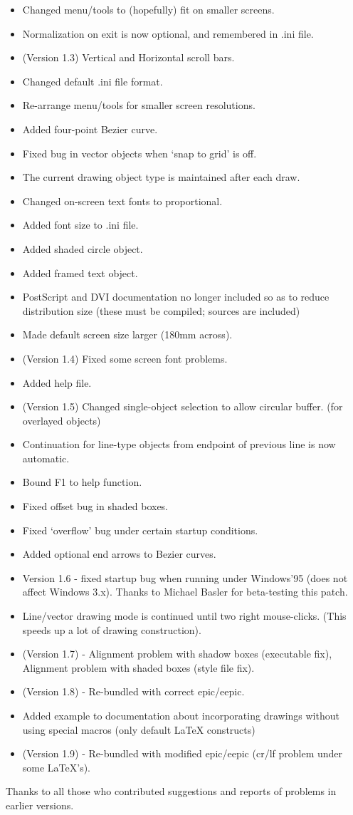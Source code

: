 \documentclass[a4paper]{article}
\begin{document}
\begin{itemize}
	\item Changed menu/tools to (hopefully) fit on smaller screens.
	\item Normalization on exit is now optional, and remembered in .ini file.
	\item (Version 1.3) Vertical and Horizontal scroll bars.
	\item Changed default .ini file format.
	\item Re-arrange menu/tools for smaller screen resolutions.
	\item Added four-point Bezier curve.
	\item Fixed bug in vector objects when `snap to grid' is off.
	\item The current drawing object type is maintained after each draw.
	\item Changed on-screen text fonts to proportional.
	\item Added font size to .ini file.
	\item Added shaded circle object.
	\item Added framed text object.
	\item PostScript and DVI documentation no longer included so as to reduce
		distribution size (these must be compiled; sources are included)
	\item Made default screen size larger (180mm across).
	\item (Version 1.4) Fixed some screen font problems.
	\item Added help file.
	\item (Version 1.5) Changed single-object selection to allow circular buffer.
		(for overlayed objects)
	\item Continuation for line-type objects from endpoint of previous line is now automatic.
	\item Bound F1 to help function.
	\item Fixed offset bug in shaded boxes.
	\item Fixed `overflow' bug under certain startup conditions.
	\item Added optional end arrows to Bezier curves.
	\item Version 1.6 - fixed startup bug when running under
		Windows'95 (does not affect Windows 3.x). Thanks to
		Michael Basler for beta-testing this patch.
	\item Line/vector drawing mode is continued until two right mouse-clicks.
		(This speeds up a lot of drawing construction).
	\item (Version 1.7) - Alignment problem with shadow boxes (executable fix),
		Alignment problem with shaded boxes (style file fix).
	\item (Version 1.8) - Re-bundled with correct epic/eepic.
	\item Added example to documentation about incorporating drawings
			without using special macros (only default \LaTeX\/ constructs)
	\item (Version 1.9) - Re-bundled with modified epic/eepic 
		(cr/lf problem under some \LaTeX's).
\end{itemize}
Thanks to all those who contributed suggestions and reports of 
problems in earlier versions. 
\end{document}
